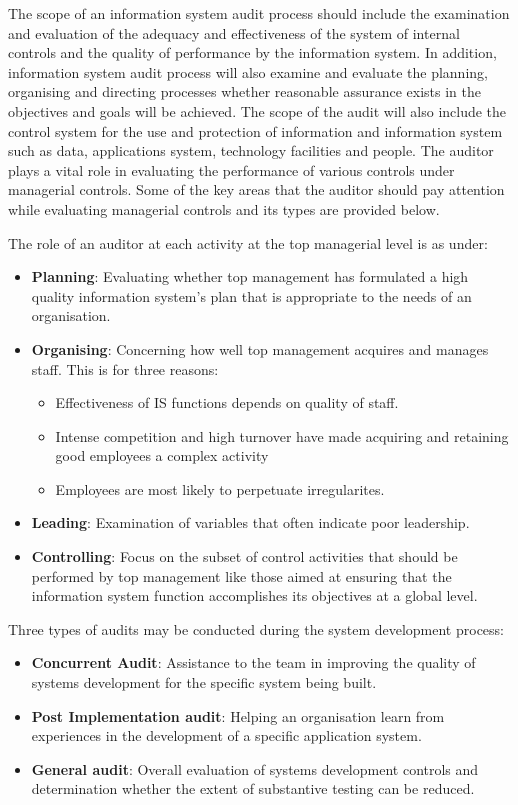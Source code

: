 \documentclass[12pt]{article}
\begin{document}
The scope of an information system audit process should include the examination and evaluation of the adequacy and effectiveness of the system of internal controls and the quality of performance by the information system. In addition, information system audit process will also examine and evaluate the planning, organising and directing processes whether reasonable assurance exists in the objectives and goals will be achieved. The scope of the audit will also include the control system for the use and protection of information and information system such as data, applications system, technology facilities and people.
\newpage
The auditor plays a vital role in evaluating the performance of various controls under managerial controls. Some of the key areas that the auditor should pay attention while evaluating managerial controls and its types are provided below.
\par
The role of an auditor at each activity at the top managerial level is as under:
\begin{itemize}
    \item \textbf{Planning}: Evaluating whether top management has formulated a high quality information system's plan that is appropriate to the needs of an organisation.
    \item \textbf{Organising}: Concerning how well top management acquires and manages staff. This is for three reasons:
    \begin{itemize}
        \item Effectiveness of IS functions depends on quality of staff.
        \item Intense competition and high turnover have made acquiring and retaining good employees a complex activity
        \item Employees are most likely to perpetuate irregularites.
    \end{itemize}
    \item \textbf{Leading}: Examination of variables that often indicate poor leadership.
    \item \textbf{Controlling}: Focus on the subset of control activities that should be performed by top management like those aimed at ensuring that the information system function accomplishes its objectives at a global level.
\end{itemize}
Three types of audits may be conducted during the system development process:
\begin{itemize}
    \item \textbf{Concurrent Audit}: Assistance to the team in improving the quality of systems development for the specific system being built.
    \item \textbf{Post Implementation audit}: Helping an organisation learn from experiences in the development of a specific application system.
    \item \textbf{General audit}: Overall evaluation of systems development controls and determination whether the extent of substantive testing can be reduced.
\end{itemize}
\end{document}
